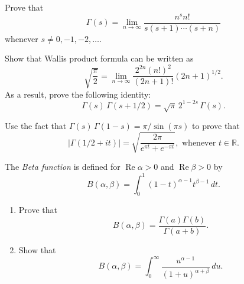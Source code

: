 \documentclass[12 pt, letterpaper]{hmcpset}
\begin{document}
\pagebreak

\begin{problem}[1.]
	Prove that
	\[
		\Gamma(s) = \lim_{n \to \infty} \frac{n^{s} n!}{s (s + 1) \dotsm (s + n)}
	\]
	whenever $s \neq 0, -1, -2, \dots$.
\end{problem}

\pagebreak

\begin{problem}[3.]
	Show that Wallis product formula can be written as
	\[
		\sqrt{\frac{\pi}{2}} = \lim_{n \to \infty} \frac{2^{2n} (n!)^{2}}{(2n + 1)!} (2n + 1)^{1/2}.
	\]
	As a result, prove the following identity:
	\[
		\Gamma(s) \, \Gamma(s + 1/2) = \sqrt{\pi} \, 2^{1 - 2 s} \, \Gamma(s).	
	\]
\end{problem}

\pagebreak

\begin{problem}[5.]
	Use the fact that $\Gamma(s) \, \Gamma(1 - s) = \pi / \sin{(\pi s)}$ to prove that
	\[
		\lvert \Gamma(1/2 + i t) \rvert = \sqrt{\frac{2 \pi}{e^{\pi t} + e^{-\pi t}}}, \text{ whenever } t \in \mathbb{R}.
	\]
\end{problem}

\pagebreak

\begin{problem}[7.]
	The \emph{Beta function} is defined for $\operatorname{Re} \alpha > 0$ and $\operatorname{Re} \beta > 0$ by
	\[
		B(\alpha, \beta) = \int_{0}^{1} (1 - t)^{\alpha - 1} t^{\beta - 1} \, dt.
	\]
	\begin{enumerate}
		\item Prove that
			\[
				B(\alpha, \beta) = \frac{\Gamma(a) \Gamma(b)}{\Gamma(a + b)}.
			\]
		\item Show that
			 \[
				B(\alpha, \beta) = \int_{0}^{\infty} \frac{u^{\alpha - 1}}{(1 + u)^{\alpha + \beta}} \, du.
			\]
	\end{enumerate}
\end{problem}
\end{document}
